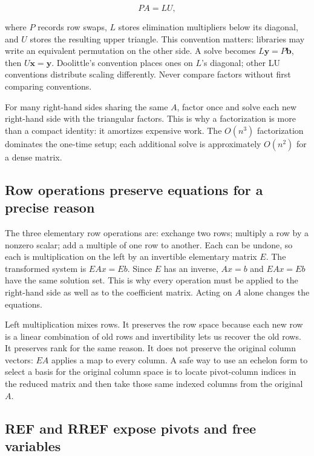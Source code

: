 \[
PA=LU,
\]

where \(P\) records row swaps, \(L\) stores elimination multipliers below its diagonal, and \(U\) stores the resulting upper triangle. This convention matters: libraries may write an equivalent permutation on the other side. A solve becomes \(L\mathbf y=P\mathbf b\), then \(U\mathbf x=\mathbf y\). Doolittle's convention places ones on \(L\)'s diagonal; other LU conventions distribute scaling differently. Never compare factors without first comparing conventions.

For many right-hand sides sharing the same \(A\), factor once and solve each new right-hand side with the triangular factors. This is why a factorization is more than a compact identity: it amortizes expensive work. The \(O(n^3)\) factorization dominates the one-time setup; each additional solve is approximately \(O(n^2)\) for a dense matrix.

\subsection{Row operations preserve equations for a precise reason}\label{01-foundations-i-ch019-row-operations-preserve-equations-for-a-precise-reason}

\hypertarget{01-foundations-i-ch019-row-operations-preserve-equations-for-a-precise-reason}{}

The three elementary row operations are: exchange two rows; multiply a row by a nonzero scalar; add a multiple of one row to another. Each can be undone, so each is multiplication on the left by an invertible elementary matrix \(E\). The transformed system is \(EAx=Eb\). Since \(E\) has an inverse, \(Ax=b\) and \(EAx=Eb\) have the same solution set. This is why every operation must be applied to the right-hand side as well as to the coefficient matrix. Acting on \(A\) alone changes the equations.

Left multiplication mixes rows. It preserves the row space because each new row is a linear combination of old rows and invertibility lets us recover the old rows. It preserves rank for the same reason. It does not preserve the original column vectors: \(EA\) applies a map to every column. A safe way to use an echelon form to select a basis for the original column space is to locate pivot-column indices in the reduced matrix and then take those same indexed columns from the original \(A\).

\subsection{REF and RREF expose pivots and free variables}\label{01-foundations-i-ch019-ref-and-rref-expose-pivots-and-free-variables}

